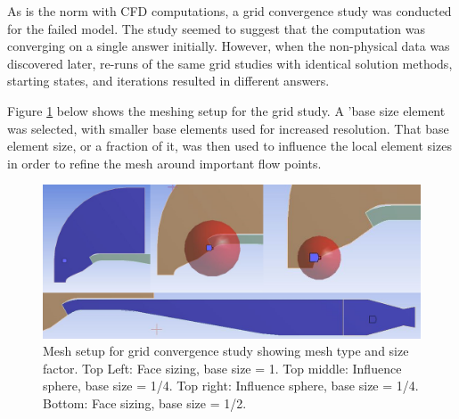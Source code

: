 As is the norm with CFD computations, a grid convergence study was conducted for the failed model. The study seemed to suggest that the computation was converging on a single answer initially. However, when the non-physical data was discovered later, re-runs of the same grid studies with identical solution methods, starting states, and iterations resulted in different answers.

Figure \ref{fig:InletMeshDrivers} below shows the meshing setup for the grid study. A 'base size element was selected, with smaller base elements used for increased resolution. That base element size, or a fraction of it, was then used to influence the local element sizes in order to refine the mesh around important flow points.

\begin{figure}[H]
\centering
\includegraphics[width=1.0\textwidth]{JWE_Figures/MeshGroup.png}
\caption{Mesh setup for grid convergence study showing mesh type and size factor. Top Left: Face sizing, base size = 1. Top middle: Influence sphere, base size = 1/4.  Top right: Influence sphere, base size = 1/4. Bottom: Face sizing, base size = 1/2. }
\label{fig:InletMeshDrivers}
\end{figure}